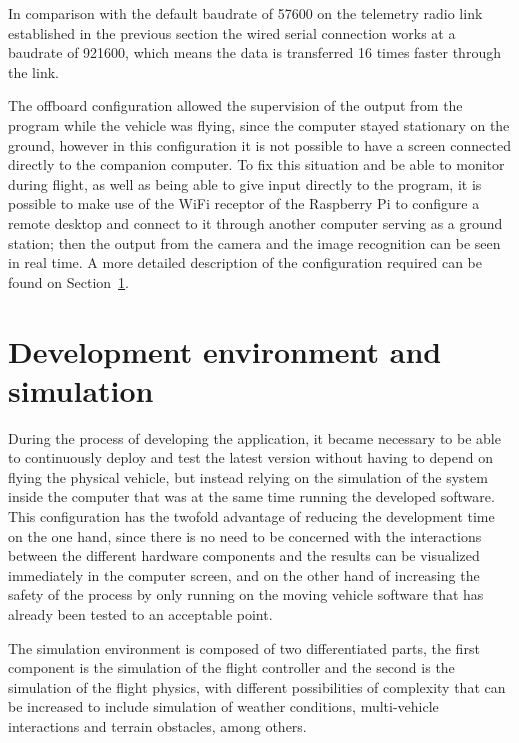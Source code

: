 In comparison with the default baudrate of 57600 on the telemetry radio link established in the previous section the wired serial connection works at a baudrate of 921600, which means the data is transferred 16 times faster through the link.

The offboard configuration allowed the supervision of the output from the program while the vehicle was flying, since the computer stayed stationary on the ground, however in this configuration it is not possible to have a screen connected directly to the companion computer.
To fix this situation and be able to monitor during flight, as well as being able to give input directly to the program, it is possible to make use of the WiFi receptor of the Raspberry Pi to configure a remote desktop and connect to it through another computer serving as a ground station;
then the output from the camera and the image recognition can be seen in real time.
A more detailed description of the configuration required can be found on Section~\ref{sec:devenv}.

\section{Development environment and simulation}
\label{sec:devenv}
During the process of developing the application, it became necessary to be able to continuously deploy and test the latest version without having to depend on flying the physical vehicle, but instead relying on the simulation of the system inside the computer that was at the same time running the developed software.
This configuration has the twofold advantage of reducing the development time on the one hand, since there is no need to be concerned with the interactions between the different hardware components and the results can be visualized immediately in the computer screen, and on the other hand of increasing the safety of the process by only running on the moving vehicle software that has already been tested to an acceptable point.

The simulation environment is composed of two differentiated parts, the first component is the simulation of the flight controller and the second is the simulation of the flight physics, with different possibilities of complexity that can be increased to include simulation of weather conditions, multi-vehicle interactions and terrain obstacles, among others.

